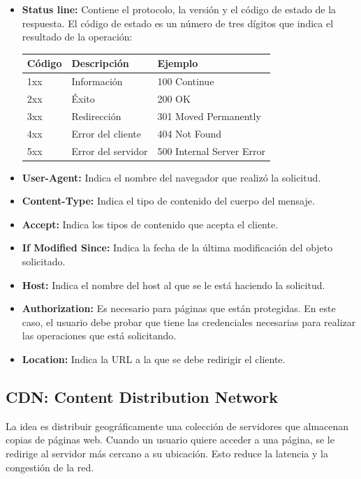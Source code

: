 \begin{itemize}
  \item \textbf{Status line:} Contiene el protocolo, la versión y el código de estado de la respuesta. El código de estado es un número de tres dígitos que indica el resultado de la operación:
  \begin{center}
    \begin{tabularx}{0.8\textwidth}{l|l|l}
      \textbf{Código} & \textbf{Descripción} & \textbf{Ejemplo} \\
      \hline
      1xx & Información & 100 Continue \\
      2xx & Éxito & 200 OK \\
      3xx & Redirección & 301 Moved Permanently \\
      4xx & Error del cliente & 404 Not Found \\
      5xx & Error del servidor & 500 Internal Server Error \\     
    \end{tabularx}
  \end{center}
  \item \textbf{User-Agent:} Indica el nombre del navegador que realizó la solicitud.
  \item \textbf{Content-Type:} Indica el tipo de contenido del cuerpo del mensaje.
  \item \textbf{Accept:} Indica los tipos de contenido que acepta el cliente.
  \item \textbf{If Modified Since:} Indica la fecha de la última modificación del objeto solicitado.
  \item \textbf{Host:} Indica el nombre del host al que se le está haciendo la solicitud.
  \item \textbf{Authorization:} Es necesario para páginas que están protegidas. En este caso, el usuario debe probar que tiene las credenciales necesarias para realizar las operaciones que está solicitando.
  \item \textbf{Location:} Indica la URL a la que se debe redirigir el cliente.
\end{itemize}

\subsection{CDN: Content Distribution Network}
La idea es distribuir geográficamente una colección de servidores que almacenan copias de páginas web. Cuando un usuario quiere acceder a una página, se le redirige al servidor más cercano a su ubicación. Esto reduce la latencia y la congestión de la red.

